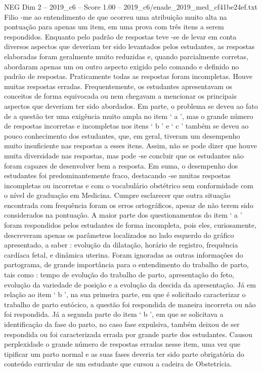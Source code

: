 \begin{textsample}{NEG Dim 2 – 2019\_c6 – Score 1.00 – 2019\_c6/enade\_2019\_med\_cf41be24ef.txt}
Filio -me ao entendimento de que ocorreu uma atribuição muito alta na pontuação para apenas um item, em uma prova com três itens a serem respondidos.
Enquanto pelo padrão de respostas teve -se de levar em conta diversos aspectos que deveriam ter sido levantados pelos estudantes, as respostas elaboradas foram geralmente muito reduzidas e, quando parcialmente corretas, abordaram apenas um ou outro aspecto exigido pelo comando e definido no padrão de respostas.
Praticamente todas as respostas foram incompletas.
Houve muitas respostas erradas.
Frequentemente, os estudantes apresentavam os conceitos de forma equivocada ou nem chegavam a mencionar os principais aspectos que deveriam ter sido abordados.
Em parte, o problema se deveu ao fato de a questão ter uma exigência muito ampla no item ‘ a ’, mas o grande número de respostas incorretas e incompletas nos itens ‘ b ’ e ‘ c ’ também se deveu ao pouco conhecimento dos estudantes, que, em geral, tiveram um desempenho muito insuficiente nas respostas a esses itens.
Assim, não se pode dizer que houve muita diversidade nas respostas, mas pode -se concluir que os estudantes não foram capazes de desenvolver bem a resposta.
Em suma, o desempenho dos estudantes foi predominantemente fraco, destacando -se muitas respostas incompletas ou incorretas e com o vocabulário obstétrico sem conformidade com o nível de graduação em Medicina.
Cumpre esclarecer que outra situação encontrada com frequência foram os erros ortográficos, apesar de não terem sido considerados na pontuação.
A maior parte dos questionamentos do item ‘ a ’ foram respondidos pelos estudantes de forma incompleta, pois eles, curiosamente, descreveram apenas os parâmetros localizados no lado esquerdo do gráfico apresentado, a saber : evolução da dilatação, horário de registro, frequência cardíaca fetal, e dinâmica uterina.
Foram ignoradas as outras informações do partograma, de grande importância para o entendimento do trabalho de parto, tais como : tempo de evolução do trabalho de parto, apresentação do feto, evolução da variedade de posição e a evolução da descida da apresentação.
Já em relação ao item ‘ b ’, na sua primeira parte, em que é solicitado caracterizar o trabalho de parto eutócico, a questão foi respondida de maneira incorreta ou não foi respondida.
Já a segunda parte do item ‘ b ’, em que se solicitava a identificação da fase do parto, no caso fase expulsiva, também deixou de ser respondida ou foi caracterizada errada por grande parte dos estudantes.
Causou perplexidade o grande número de respostas erradas nesse item, uma vez que tipificar um parto normal e as suas fases deveria ter sido parte obrigatória do conteúdo curricular de um estudante que cursou a cadeira de Obstetrícia.

\end{textsample}
